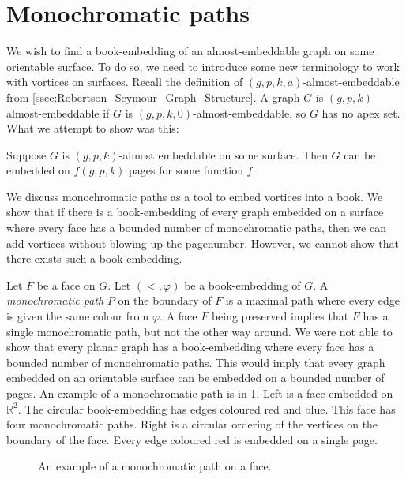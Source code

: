 \section{Monochromatic paths}

We wish to find a book-embedding of an almost-embeddable graph on some orientable surface. To do so, we need to introduce some new terminology to work with vortices on surfaces. 
Recall the definition of $(g, p, k, a)$-almost-embeddable from \cref{ssec:Robertson_Seymour_Graph_Structure}. A graph $G$ is $(g, p, k)$-almost-embeddable if $G$ is $(g, p, k, 0)$-almost-embeddable, so $G$ has no apex set.
What we attempt to show was this:
\begin{conjecture}\label{thm:bounded_almost_embeddable}
	Suppose $G$ is $(g, p, k)$-almost embeddable on some surface. Then $G$ can be embedded on \(f(g, p, k)\) pages for some function $f$.
\end{conjecture}

We discuss monochromatic paths as a tool to embed vortices into a book. We show that if there is a book-embedding of every graph embedded on a surface where every face has a bounded number of monochromatic paths, then we can add vortices without blowing up the pagenumber. However, we cannot show that there exists such a book-embedding.

Let \(F\) be a face on \(G\). Let \( (<, \varphi) \) be a book-embedding of \(G\). A \textit{monochromatic path} $P$ on the boundary of $F$ is a maximal path where every edge is given the same colour from $\varphi$. A face $F$ being preserved implies that $F$ has a single monochromatic path, but not the other way around. We were not able to show that every planar graph has a book-embedding where every face has a bounded number of monochromatic paths. This would imply that every graph embedded on an orientable surface can be embedded on a bounded number of pages. An example of a monochromatic path is in \cref{fig:mono_paths}. Left is a face embedded on $\mathbb{R}^2$. The circular book-embedding has edges coloured red and blue. This face has four monochromatic paths. Right is a circular ordering of the vertices on the boundary of the face. Every edge coloured red is embedded on a single page.

\begin{figure}[h!]
	\centering
	
	\caption[Monochromatic paths]{An example of a monochromatic path on a face.}\label{fig:mono_paths}
\end{figure}

